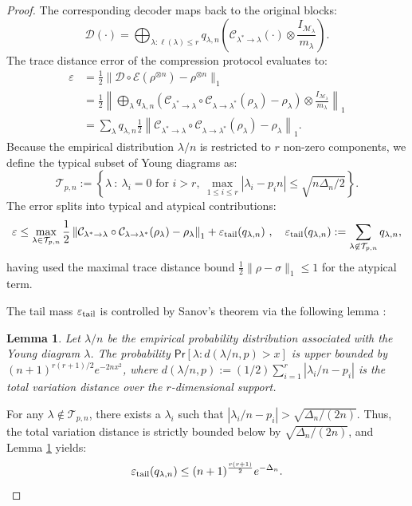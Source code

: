 \documentclass[11pt,letterpaper]{article}
\newtheorem{lem}{Lemma}
\def\eps{\varepsilon}
\def\map{\mathcal}
\begin{document}
\begin{proof}
The corresponding decoder maps back to the original blocks:
\begin{equation}
    \map{D}(\cdot) = \bigoplus_{\lambda : \ell(\lambda) \le r} q_{\lambda,n}\left(\map{C}_{\lambda^*\to \lambda}(\cdot)\otimes\frac{I_{\map{M}_\lambda}}{m_\lambda}\right).
\end{equation}
The trace distance error of the compression protocol evaluates to:
\begin{equation}
\begin{aligned}
    \eps &= \frac12\|\map{D}\circ\map{E}(\rho^{\otimes n})-\rho^{\otimes n}\|_1\\
    &= \frac12\left\|\bigoplus_{\lambda}q_{\lambda,n}\left(\map{C}_{\lambda^*\to \lambda}\circ\map{C}_{\lambda\to \lambda^*}(\rho_\lambda)-\rho_\lambda\right)\otimes\frac{I_{\map{M}_\lambda}}{m_\lambda}\right\|_1\\
    &= \sum_{\lambda}q_{\lambda,n} \frac12 \left\|\map{C}_{\lambda^*\to \lambda}\circ\map{C}_{\lambda\to \lambda^*}(\rho_\lambda)-\rho_\lambda\right\|_1.
\end{aligned}
\end{equation}
Because the empirical distribution $\lambda/n$ is restricted to $r$ non-zero components, we define the typical subset of Young diagrams as:
\begin{equation}\label{eq:typical_set}
\mathcal{T}_{p,n}:=\left\{\lambda~:~\lambda_i = 0 \text{ for } i>r, \ \max_{1 \le i \le r}|\lambda_i-p_i n|\le \sqrt{n\Delta_n/2} \right\}.
\end{equation}
The error splits into typical and atypical contributions:
\begin{equation}\label{eq:error_twoterms}
\eps \le \max_{\lambda\in\mathcal{T}_{p,n}} \frac12\left\|\map{C}_{\lambda^*\to \lambda}\circ\map{C}_{\lambda\to \lambda^*}(\rho_\lambda)-\rho_\lambda\right\|_1 + \eps_{\rm tail}(q_{\lambda,n}) \ , \quad \eps_{\rm tail}(q_{\lambda,n}):=\sum_{\lambda\not\in\mathcal{T}_{p,n}}q_{\lambda,n}, 
\end{equation}
having used the maximal trace distance bound $\frac12\|\rho-\sigma\|_1\le 1$ for the atypical term.

The tail mass $\eps_{\rm tail}$ is controlled by Sanov's theorem via the following lemma \cite{christandl2006spectra,o2021quantum,yang2016efficient,hayashi2017group}:
\begin{lem}\label{lem:tail_prob}
    Let $\lambda/n$ be the empirical probability distribution associated with the Young diagram $\lambda$.
    The probability $\mathsf{Pr}[\lambda:d(\lambda/n,p)>x]$ is upper bounded by $(n+1)^{r(r+1)/2} e^{-2nx^2}$, where $d(\lambda/n,p):=(1/2)\sum_{i=1}^r|\lambda_i/n-p_i|$ is the total variation distance over the $r$-dimensional support.
\end{lem}
For any $\lambda\not\in\mathcal{T}_{p,n}$, there exists a $\lambda_i$ such that $|\lambda_i/n-p_i|>\sqrt{\Delta_n/(2n)}$. Thus, the total variation distance is strictly bounded below by $\sqrt{\Delta_n/(2n)}$, and Lemma \ref{lem:tail_prob} yields:
\begin{equation}\label{eq:tail_prob_bound}
    \eps_{\rm tail}(q_{\lambda,n})\le (n+1)^{\frac{r(r+1)}2} e^{-\Delta_n}.
\end{equation} 


\end{proof}
\end{document}
